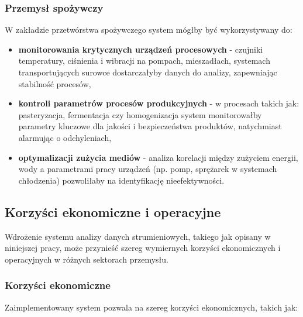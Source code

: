 \subsubsection{Przemysł spożywczy}
\label{subsubsec:przemysl_spozywczy}

W zakładzie przetwórstwa spożywczego system mógłby być wykorzystywany do:

\begin{itemize}
    \item \textbf{monitorowania krytycznych urządzeń procesowych} - czujniki temperatury, ciśnienia i wibracji na pompach, mieszadłach, systemach transportujących surowce dostarczałyby danych do analizy, zapewniając stabilność procesów,
    \item \textbf{kontroli parametrów procesów produkcyjnych} - w procesach takich jak: pasteryzacja, fermentacja czy homogenizacja system monitorowałby parametry kluczowe dla jakości i bezpieczeństwa produktów, natychmiast alarmując o odchyleniach,
    \item \textbf{optymalizacji zużycia mediów} - analiza korelacji między zużyciem energii, wody a parametrami pracy urządzeń (np. pomp, sprężarek w systemach chłodzenia) pozwoliłaby na identyfikację nieefektywności.
\end{itemize}

\subsection{Korzyści ekonomiczne i operacyjne}
\label{subsec:korzysci}

Wdrożenie systemu analizy danych strumieniowych, takiego jak opisany w niniejszej pracy, może przynieść szereg wymiernych korzyści ekonomicznych i operacyjnych w różnych sektorach przemysłu.

\subsubsection{Korzyści ekonomiczne}
\label{subsubsec:korzysci_ekonomiczne}

Zaimplementowany system pozwala na szereg korzyści ekonomicznych, takich jak:

